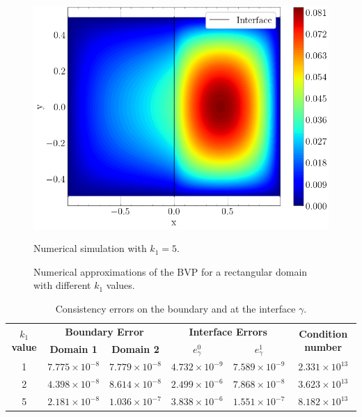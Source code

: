 \begin{figure}[!htb]
    \begin{minipage}{.6\textwidth}
      \centering
      \includegraphics[width=0.8\linewidth]{Images/Transmission/Rectangle_contour_600_150_k1_5.png}
      \caption{Numerical simulation with  \(k_1=5\).}
      \label{transmission_rectangle_plot_k1_5}
    \end{minipage}
    
    \caption*{Numerical approximations of the \ac{BVP} for a rectangular domain with different \(k_1\) values.}
    \label{transmission_rectangle_plots}
\end{figure}

\begin{table}[htbp]
    \centering
    \begin{tabular}{cccccc}
      \toprule
      \multirow{2}{*}{\textbf{\(k_1\) value}} & \multicolumn{2}{c}{\textbf{Boundary Error}} & \multicolumn{2}{c}{\textbf{Interface Errors}} & \multirow{2}{*}{\textbf{Condition number}} \\
      \cmidrule(lr){2-3} \cmidrule(lr){4-5}
      & \textbf{Domain 1} & \textbf{Domain 2} & \textbf{\(e_\gamma^0\)} & \textbf{\(e_\gamma^1\)} & \\
      \midrule
      1 & $7.775\times10^{-8}$ & $7.779\times10^{-8}$ & $4.732\times10^{-9}$ & $7.589\times10^{-9}$ & $2.331\times 10^{13}$\\
      2 & $4.398\times10^{-8}$ & $8.614\times10^{-8}$ & $2.499\times10^{-6}$ & $7.868\times10^{-8}$ & $3.623\times 10^{13}$\\
      5 & $2.181\times10^{-8}$ & $1.036\times10^{-7}$ & $3.838\times10^{-6}$ & $1.551\times10^{-7}$ & $8.182\times 10^{13}$\\
      \bottomrule
    \end{tabular}
    \caption{Consistency errors on the boundary and at the interface \(\gamma\).}
    \label{tab:transmission_results_rectangle}
\end{table}

